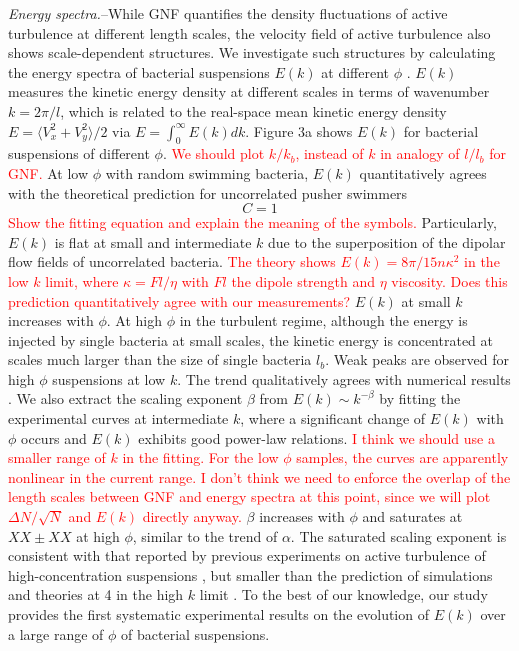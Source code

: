 \documentclass[twocolumn,aps,prl,amsmath,amssymb,longbibliography]{revtex4-2}
\begin{document}
\textit{Energy spectra.}--While GNF quantifies the density fluctuations of active turbulence at different length scales, the velocity field of active turbulence also shows scale-dependent structures. We investigate such structures by calculating the energy spectra of bacterial suspensions $E(k)$ at different $\phi$ \cite{Liu2020}. $E(k)$ measures the kinetic energy density at different scales in terms of wavenumber $k = 2\pi/l$, which is related to the real-space mean kinetic energy density $E = \langle V_x^2 + V_y^2 \rangle/2$ via $E = \int_0^\infty E(k)dk$. Figure 3a shows $E(k)$ for bacterial suspensions of different $\phi$. \textcolor{red}{We should plot $k/k_b$, instead of $k$ in analogy of $l/l_b$ for GNF.}
At low $\phi$ with random swimming bacteria, $E(k)$ quantitatively agrees with the theoretical prediction for uncorrelated pusher swimmers \cite{Bardfalvy2019}
\begin{equation}
C = 1
\end{equation}
\textcolor{red}{Show the fitting equation and explain the meaning of the symbols.} Particularly, $E(k)$ is flat at small and intermediate $k$ due to the superposition of the dipolar flow fields of uncorrelated bacteria. \textcolor{red}{The theory shows $E(k) = 8\pi/15 n \kappa^2$ in the low $k$ limit, where $\kappa = Fl/\eta$ with $Fl$ the dipole strength and $\eta$ viscosity. Does this prediction quantitatively agree with our measurements?}  $E(k)$ at small $k$ increases with $\phi$. At high $\phi$ in the turbulent regime, although the energy is injected by single bacteria at small scales, the kinetic energy is concentrated at scales much larger than the size of single bacteria $l_b$.
Weak peaks are observed for high $\phi$ suspensions at low $k$. The trend qualitatively agrees with numerical results \cite{Saintillan2012,Bardfalvy2019}. We also extract the scaling exponent $\beta$ from $E(k) \sim k^{-\beta}$ by fitting the experimental curves at intermediate $k$, where a significant change of $E(k)$ with $\phi$ occurs and $E(k)$ exhibits good power-law relations. \textcolor{red}{I think we should use a smaller range of $k$ in the fitting. For the low $\phi$ samples, the curves are apparently nonlinear in the current range.
I don't think we need to enforce the overlap of the length scales between GNF and energy spectra at this point, since we will plot $\Delta N/\sqrt{N}$ and $E(k)$ directly anyway.} $\beta$ increases with $\phi$ and saturates at $XX \pm XX$ at high $\phi$, similar to the trend of $\alpha$. The saturated scaling exponent is consistent with that reported by previous experiments on active turbulence of high-concentration suspensions \cite{Wensink2012,Creppy2015,Patteson2018}, but smaller than the prediction of simulations and theories at 4 in the high $k$ limit
\cite{Saintillan2012,Giomi2015,Bardfalvy2019}. To the best of our knowledge, our study provides the first systematic experimental results on the evolution of $E(k)$ over a large range of $\phi$ of bacterial suspensions.
\end{document}
